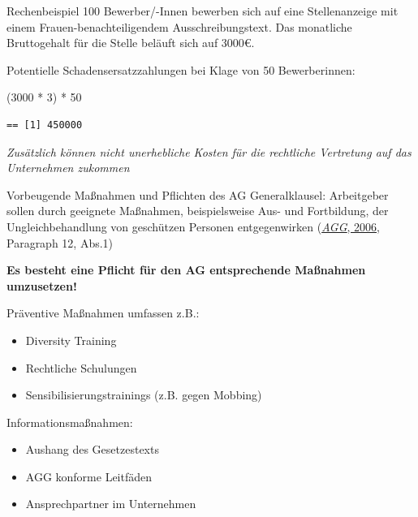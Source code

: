 \documentclass[
  10pt,
  ngerman,
  ignorenonframetext,
]{beamer}
\newenvironment{Shaded}{\begin{snugshade}}{\end{snugshade}}
\newcommand{\DecValTok}[1]{\textcolor[rgb]{0.00,0.00,0.81}{#1}}
\newcommand{\NormalTok}[1]{#1}
\newcommand{\SpecialCharTok}[1]{\textcolor[rgb]{0.00,0.00,0.00}{#1}}
\providecommand{\tightlist}{%
  \setlength{\itemsep}{0pt}\setlength{\parskip}{0pt}}
\begin{document}
\begin{frame}[fragile]{Rechenbeispiel}
\protect\hypertarget{rechenbeispiel}{}
100 Bewerber/-Innen bewerben sich auf eine Stellenanzeige mit einem
Frauen-benachteiligendem Ausschreibungstext. Das monatliche Bruttogehalt
für die Stelle beläuft sich auf 3000€.

Potentielle Schadensersatzzahlungen bei Klage von 50 Bewerberinnen:

\begin{Shaded}
\begin{Highlighting}[]
\NormalTok{(}\DecValTok{3000} \SpecialCharTok{*} \DecValTok{3}\NormalTok{) }\SpecialCharTok{*} \DecValTok{50}
\end{Highlighting}
\end{Shaded}

\begin{verbatim}
== [1] 450000
\end{verbatim}

\emph{Zusätzlich können nicht unerhebliche Kosten für die rechtliche
Vertretung auf das Unternehmen zukommen}
\end{frame}

\begin{frame}{Vorbeugende Maßnahmen und Pflichten des AG}
\protect\hypertarget{vorbeugende-mauxdfnahmen-und-pflichten-des-ag}{}
Generalklausel: Arbeitgeber sollen durch geeignete Maßnahmen,
beispielsweise Aus- und Fortbildung, der Ungleichbehandlung von
geschützen Personen entgegenwirken
(\protect\hyperlink{ref-agg}{\emph{AGG}, 2006}, Paragraph 12, Abs.1)

\textbf{Es besteht eine Pflicht für den AG entsprechende Maßnahmen
umzusetzen!}

Präventive Maßnahmen umfassen z.B.:

\begin{itemize}
\tightlist
\item
  Diversity Training
\item
  Rechtliche Schulungen
\item
  Sensibilisierungstrainings (z.B. gegen Mobbing)
\end{itemize}

Informationsmaßnahmen:

\begin{itemize}
\tightlist
\item
  Aushang des Gesetzestexts
\item
  AGG konforme Leitfäden
\item
  Ansprechpartner im Unternehmen
\end{itemize}
\end{frame}
\end{document}
